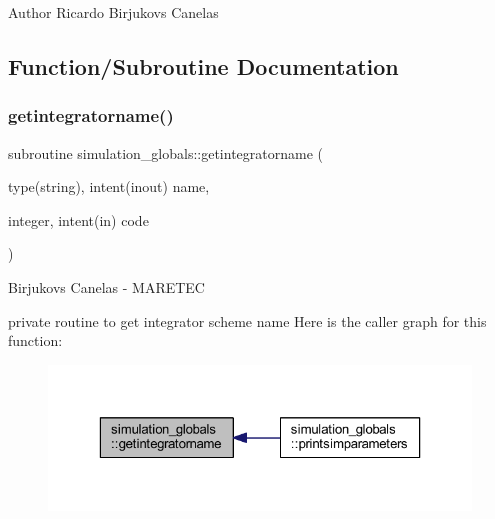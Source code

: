 \begin{DoxyAuthor}{Author}
Ricardo Birjukovs Canelas 
\end{DoxyAuthor}


\subsection{Function/\+Subroutine Documentation}
\mbox{\label{namespacesimulation__globals_a2c6bf88542c503d1da58280ab3dcf772}} 
\subsubsection{\texorpdfstring{getintegratorname()}{getintegratorname()}}
{\footnotesize\ttfamily subroutine simulation\+\_\+globals\+::getintegratorname (\begin{DoxyParamCaption}\item[{type(string), intent(inout)}]{name,  }\item[{integer, intent(in)}]{code }\end{DoxyParamCaption})\hspace{0.3cm}{\ttfamily [private]}}



Birjukovs Canelas -\/ M\+A\+R\+E\+T\+EC 

private routine to get integrator scheme name Here is the caller graph for this function\+:\nopagebreak
\begin{figure}[H]
\begin{center}
\leavevmode
\includegraphics[width=323pt]{namespacesimulation__globals_a2c6bf88542c503d1da58280ab3dcf772_icgraph}
\end{center}
\end{figure}
\mbox{\label{namespacesimulation__globals_ad90d6959da1d43e2cd1febff82187ed5}} 
